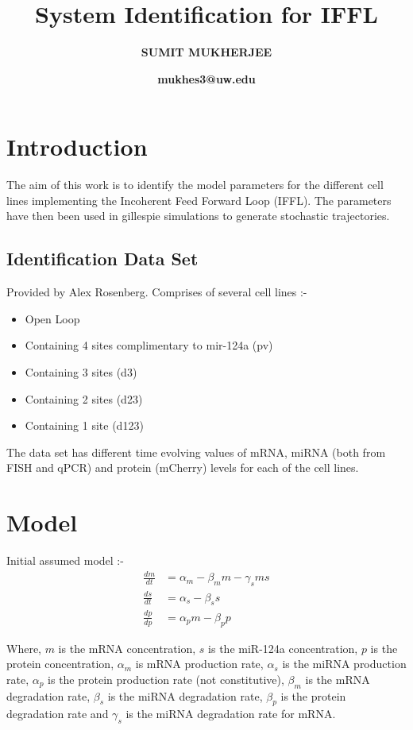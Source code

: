 \documentclass{article}
\title{System Identification for IFFL}
\author{\bf SUMIT MUKHERJEE}
\date{\bf  mukhes3@uw.edu}
\begin{document}
\maketitle%
\vspace{5 mm}

\section{Introduction}

The aim of this work is to identify the model parameters for the different cell lines implementing the Incoherent Feed Forward Loop (IFFL). The parameters have then been used in gillespie simulations to generate stochastic trajectories.

\subsection{Identification Data Set}

Provided by Alex Rosenberg. Comprises of several cell lines :- 
\begin{itemize}
\item Open Loop 
\item Containing 4 sites complimentary to mir-124a (pv) 
\item Containing 3 sites (d3) 
\item Containing 2 sites (d23) 
\item Containing 1 site (d123) 
\end{itemize}

The data set has different time evolving values of mRNA, miRNA (both from FISH and qPCR) and protein (mCherry) levels for each of the cell lines. 

\section{Model}

Initial assumed model :- 
\begin{align*}
\frac{dm}{dt} &= \alpha_{m} - \beta_m m - \gamma_s m s \\
\frac{ds}{dt} &= \alpha_s - \beta_s s \\
\frac{dp}{dp} &= \alpha_p m - \beta_p p  
\end{align*}

Where, $m$ is the mRNA concentration, $s$ is the miR-124a concentration, $p$ is the protein concentration, $\alpha_m$ is mRNA production rate, $\alpha_s$ is the miRNA production rate, $\alpha_p$ is the protein production rate (not constitutive), $\beta_m$ is the mRNA degradation rate, $\beta_s$ is the miRNA degradation rate, $\beta_p$ is the protein degradation rate and $\gamma_s$ is the miRNA degradation rate for mRNA. 
\end{document}
